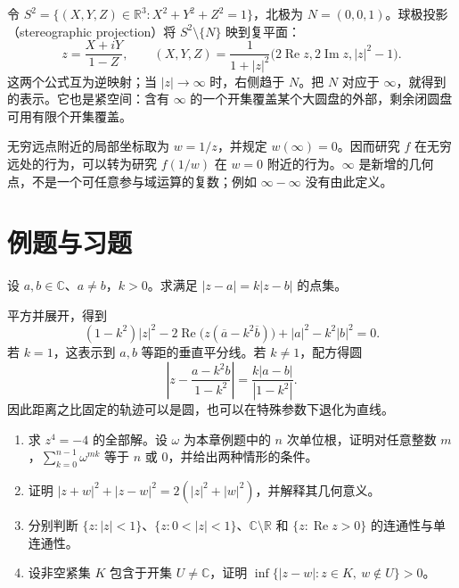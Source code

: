\documentclass[UTF8,12pt,a4paper,fontset=fandol]{ctexbook}
\begin{document}
令 $S^2=\{(X,Y,Z)\in\mathbb{R}^3:X^2+Y^2+Z^2=1\}$，北极为 $N=(0,0,1)$。球极投影（stereographic projection）将 $S^2\setminus\{N\}$ 映到复平面：
\begin{equation}
 z=\frac{X+iY}{1-Z},\qquad
 (X,Y,Z)=\frac{1}{1+|z|^2}
 \bigl(2\operatorname{Re}z,2\operatorname{Im}z,|z|^2-1\bigr).
 \label{eq:ca-stereographic}
\end{equation}
这两个公式互为逆映射；当 $|z|\to\infty$ 时，右侧趋于 $N$。把 $N$ 对应于 $\infty$，就得到的表示。它也是紧空间：含有 $\infty$ 的一个开集覆盖某个大圆盘的外部，剩余闭圆盘可用有限个开集覆盖。

无穷远点附近的局部坐标取为 $w=1/z$，并规定 $w(\infty)=0$。因而研究 $f$ 在无穷远处的行为，可以转为研究 $f(1/w)$ 在 $w=0$ 附近的行为。$\infty$ 是新增的几何点，不是一个可任意参与域运算的复数；例如 $\infty-\infty$ 没有由此定义。

\section{例题与习题}

\begin{example}[阿波罗尼斯圆]
设 $a,b\in\mathbb{C}$、$a\ne b$，$k>0$。求满足 $|z-a|=k|z-b|$ 的点集。
\end{example}
\begin{solve}
平方并展开，得到
\[
 (1-k^2)|z|^2-2\operatorname{Re}\bigl(z(\overline a-k^2\overline b)\bigr)
 +|a|^2-k^2|b|^2=0.
\]
若 $k=1$，这表示到 $a,b$ 等距的垂直平分线。若 $k\ne1$，配方得圆
\[
 \left|z-\frac{a-k^2b}{1-k^2}\right|=\frac{k|a-b|}{|1-k^2|}.
\]
因此距离之比固定的轨迹可以是圆，也可以在特殊参数下退化为直线。
\end{solve}

\begin{enumerate}
  \item\label{ex:ca-roots-sum} 求 $z^4=-4$ 的全部解。设 $\omega$ 为本章例题中的 $n$ 次单位根，证明对任意整数 $m$，$\sum_{k=0}^{n-1}\omega^{mk}$ 等于 $n$ 或 $0$，并给出两种情形的条件。
  \item\label{ex:ca-parallelogram} 证明 $|z+w|^2+|z-w|^2=2(|z|^2+|w|^2)$，并解释其几何意义。
  \item\label{ex:ca-domains} 分别判断 $\{z:|z|<1\}$、$\{z:0<|z|<1\}$、$\mathbb{C}\setminus\mathbb{R}$ 和 $\{z:\operatorname{Re}z>0\}$ 的连通性与单连通性。
  \item\label{ex:ca-separation} 设非空紧集 $K$ 包含于开集 $U\ne\mathbb{C}$，证明 $\inf\{|z-w|:z\in K,\ w\notin U\}>0$。
\end{enumerate}
\end{document}
